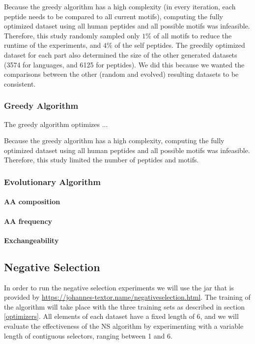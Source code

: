 \documentclass{article}
\begin{document}
Because the greedy algorithm has a high complexity (in every iteration, each peptide needs to be compared to all 
current motifs), computing the fully optimized dataset using all human peptides and all possible motifs was infeasible.
Therefore, this study randomly sampled only $1\%$ of all motifs to reduce the runtime of the experiments, and $4\%$ of 
the self peptides. The greedily optimized dataset for each part also determined the size of the other generated datasets 
(3574 for languages, and 6125 for peptides). We did this because we wanted the comparisons between the other 
(random and evolved) resulting datasets to be consistent.

\subsubsection{Greedy Algorithm}

The greedy algorithm optimizes ...

Because the greedy algorithm has a high complexity, computing the fully optimized dataset using all human peptides and
all possible motifs was infeasible. Therefore, this study limited the number of peptides and motifs.


\subsubsection{Evolutionary Algorithm} 

\paragraph{AA composition}



\paragraph{AA frequency}

\paragraph{Exchangeability}


\subsection{Negative Selection}
In order to run the negative selection experiments we will use the jar that is provided by \url{https://johannes-textor.name/negativeselection.html}.
The training of the algorithm will take place with the three training sets as described in section \ref{optimizers}.
All elements of each dataset have a fixed length of 6, and we will evaluate the effectiveness of the NS algorithm by 
experimenting  with a variable length of contiguous selectors, ranging between 1 and 6. 
\end{document}
